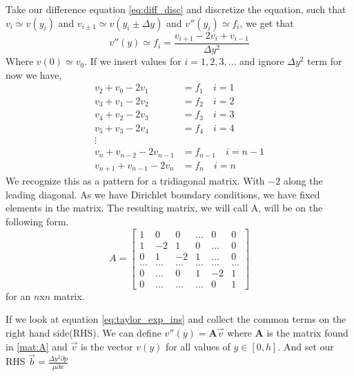 \documentclass[10pt, a4paper]{amsart}
\begin{document}
Take our difference equation \ref{eq:diff_disc} and discretize the equation, such that $v_i \simeq v(y_i)$ and $v_{i\pm 1} \simeq v(y_i \pm \Delta y)$ and $v''(y_i) \simeq f_i$, we get that
\begin{equation}
v''(y) \simeq f_i = \frac{v_{i+1}-2v_i+v_{i-1}}{\Delta y^2}
\end{equation}
Where $v(0) \simeq v_0$. If we insert values for $i = 1,2,3,\dots$ and ignore $\Delta y^2$ term for now we have,  
\begin{align*}
		v_2 + v_0 - 2v_1 &= f_1 \quad i = 1\\
		v_3 + v_1 - 2v_2 &= f_2 \quad i = 2\\
		v_4 + v_2 - 2v_3 &= f_3 \quad i = 3\\
		v_5 + v_3 - 2v_4 &= f_4 \quad i = 4\\
		\vdots \\
		v_n + v_{n-2} - 2v_{n-1} &= f_{n-1} \quad i = n-1\\
		v_{n+1} + v_{n-1} - 2v_n &= f_n \quad i = n
\end{align*}
We recognize this as a pattern for a tridiagonal matrix. With $-2$ along the leading diagonal. As we have Dirichlet boundary conditions, we have fixed elements in the matrix. The resulting matrix, we will call A, will be on the following form. 
\begin{equation}\label{mat:A}
A = 
\begin{bmatrix}
1 & 0 & 0 & \dots & 0 & 0\\
1 & -2 & 1 & 0 & \dots & 0\\
0 & 1 & -2 & 1 & \dots & 0\\
\dots & \dots & \dots & \dots & \dots & \dots \\
0 & \dots & 0 & 1 & -2 & 1\\
0 & \dots & \dots & \dots & 0 & 1 
\end{bmatrix}
\end{equation}
for an $n$x$n$ matrix.

If we look at equation \ref{eq:taylor_exp_ins} and collect the common terms on the right hand side(RHS). We can define $v''(y) = \mathbf{A}\vec{v}$ where $\mathbf{A}$ is the matrix found in \ref{mat:A} and $\vec{v}$ is the vector $v(y)$ for all values of $y \in [0,h]$. And set our RHS $\vec{b} = \frac{\Delta y^2 \partial p}{\mu\partial x}$
\end{document}
